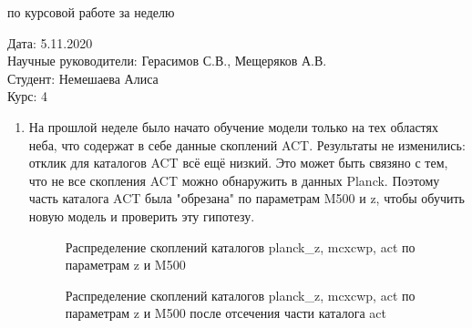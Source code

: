 \documentclass{article}
\begin{document}
\begin{center}{ по курсовой работе за неделю\\}\end{center}
Дата: 5.11.2020\\
Научные руководители: Герасимов С.В., Мещеряков А.В.\\
Студент: Немешаева Алиса\\
Курс: 4\\

\renewcommand{\labelitemi}{$\blacksquare$}
\renewcommand\labelitemii{$\square$}
\begin{enumerate}
    \item На прошлой неделе было начато обучение модели только на тех областях неба, что содержат 
        в себе данные скоплений ACT. Результаты не изменились: отклик для каталогов ACT всё ещё 
        низкий. Это может быть связяно с тем, что не все скопления ACT можно обнаружить в данных 
        Planck. Поэтому часть каталога ACT была "обрезана" по параметрам M500 и z, чтобы обучить 
        новую модель и проверить эту гипотезу.\\
    \begin{figure}[h]
        \caption{Распределение скоплений каталогов planck\_z, mcxcwp, act по параметрам z и M500}
    \end{figure}
    \begin{figure}[h]
        \caption{Распределение скоплений каталогов planck\_z, mcxcwp, act по параметрам z и M500
            после отсечения части каталога act}
    \end{figure}


\end{enumerate}
\end{document}
